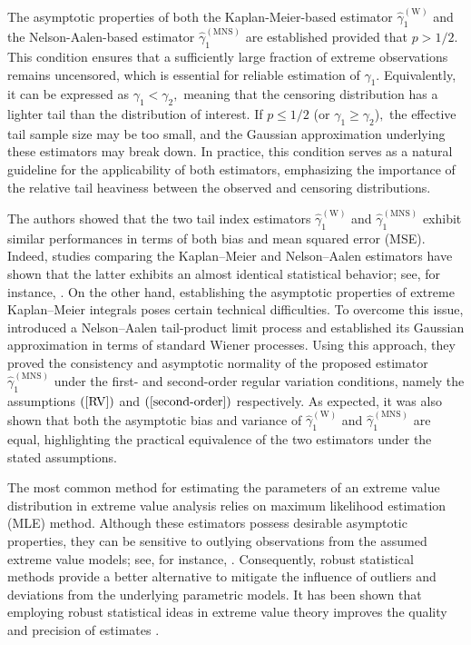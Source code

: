 \documentclass[reqno,openbib,runningheads,a4paper,12pt]{amsart}%
\begin{document}
\noindent The asymptotic properties of both the Kaplan-Meier-based estimator
$\widehat{\gamma}_{1}^{\left(  \mathrm{W}\right)  }$ and the
Nelson-Aalen-based estimator $\widehat{\gamma}_{1}^{\left(  \mathrm{MNS}%
\right)  }$ are established provided that $p>1/2.$ This condition ensures that
a sufficiently large fraction of extreme observations remains uncensored,
which is essential for reliable estimation of $\gamma_{1}.$ Equivalently, it
can be expressed as $\gamma_{1}<\gamma_{2},$ meaning that the censoring
distribution has a lighter tail than the distribution of interest. If
$p\leq1/2$ (or $\gamma_{1}\geq\gamma_{2}$)$,$ the effective tail sample size
may be too small, and the Gaussian approximation underlying these estimators
may break down. In practice, this condition serves as a natural guideline for
the applicability of both estimators, emphasizing the importance of the
relative tail heaviness between the observed and censoring
distributions.\smallskip

\noindent The authors showed that the two tail index estimators
$\widehat{\gamma}_{1}^{\left(  \mathrm{W}\right)  }$ and $\widehat{\gamma}%
_{1}^{\left(  \mathrm{MNS}\right)  }$ exhibit similar performances in terms of
both bias and mean squared error (MSE). Indeed, studies comparing the
Kaplan--Meier and Nelson--Aalen estimators have shown that the latter exhibits
an almost identical statistical behavior; see, for instance,
\cite{Colosimo2002}. On the other hand, establishing the asymptotic properties
of extreme Kaplan--Meier integrals poses certain technical difficulties. To
overcome this issue, \cite{MNS2025} introduced a Nelson--Aalen tail-product
limit process and established its Gaussian approximation in terms of standard
Wiener processes. Using this approach, they proved the consistency and
asymptotic normality of the proposed estimator $\widehat{\gamma}_{1}^{\left(
\mathrm{MNS}\right)  }$ under the first- and second-order regular variation
conditions, namely the assumptions $\left(  \ref{RV}\right)  $ and $\left(
\ref{second-order}\right)  $ respectively. As expected, it was also shown that
both the asymptotic bias and variance of $\widehat{\gamma}_{1}^{\left(
\mathrm{W}\right)  }$ and $\widehat{\gamma}_{1}^{\left(  \mathrm{MNS}\right)
}$ are equal, highlighting the practical equivalence of the two estimators
under the stated assumptions.\smallskip

\noindent The most common method for estimating the parameters of an extreme
value distribution in extreme value analysis relies on maximum likelihood
estimation (MLE) method. Although these estimators possess desirable
asymptotic properties, they can be sensitive to outlying observations from the
assumed extreme value models; see, for instance, \cite{BS2000}. Consequently,
robust statistical methods provide a better alternative to mitigate the
influence of outliers and deviations from the underlying parametric models. It
has been shown that employing robust statistical ideas in extreme value theory
improves the quality and precision of estimates \citep[][]{DE2006}.\smallskip
\end{document}
